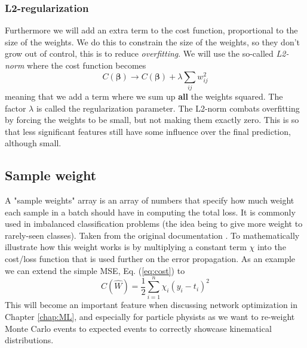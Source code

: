 \documentclass[12pt, a4paper]{book}
\begin{document}
\subsubsection*{L2-regularization}
Furthermore we will add an extra term to the cost function, proportional to the size of the weights. We do this to constrain the size of the weights, so they don't grow out of control, 
this is to reduce \textit{overfitting}. We will use the so-called \textit{L2-norm} where the cost function becomes
\begin{equation}\label{eq:L2-reg}
    C(\bm\beta)\rightarrow C(\bm\beta)+\lambda\sum_{ij}w_{ij}^2
\end{equation}
meaning that we add a term where we sum up \textbf{all} the weights squared. The factor $\lambda$ is called the regularization parameter. The L2-norm combats overfitting by forcing the weights to be small, but not making them exactly zero. 
This is so that less significant features still have some influence over the final prediction, although small.


\subsection{Sample weight}\label{sec:sample_weight}
A "sample weights" array is an array of numbers that specify how much weight each sample in a batch should have in computing the total loss. 
It is commonly used in imbalanced classification problems (the idea being to give more weight to rarely-seen classes). Taken from the original documentation \cite{tf_sample_wgt}. To mathematically illustrate how this 
weight works is by multiplying a constant term $\chi$ into the cost/loss function that is used further on the error propagation. As an example we can extend the simple MSE, Eq. (\ref{eq:cost}) to
\begin{equation}\label{eq:sample_weight}
    C(\hat{W})=\frac{1}{2}\sum_{i=1}^n\chi_i(y_i-t_i)^2
\end{equation}
This will become an important feature when discussing network optimization in Chapter \ref{chap:ML}, and especially for particle physists as we want to re-weight Monte Carlo events to expected events to correctly showcase kinematical distributions.
\end{document}
